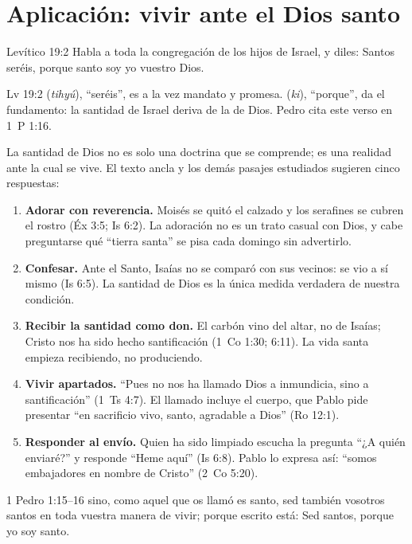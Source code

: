 \section{Aplicación: vivir ante el Dios santo}

\begin{verso}{Levítico 19:2}
Habla a toda la congregación de los hijos de Israel, y diles: Santos seréis, porque santo soy yo \SENOR{} vuestro Dios.
\end{verso}

\begin{filologiatexto}{Lv 19:2}
 (\emph{tihyú}), ``seréis'', es a la vez mandato y promesa.  (\emph{ki}), ``porque'', da el fundamento: la santidad de Israel deriva de la de Dios. Pedro cita este verso en 1~P 1:16.
\end{filologiatexto}

La santidad de Dios no es solo una doctrina que se comprende; es una realidad ante la cual se vive. El texto ancla y los demás pasajes estudiados sugieren cinco respuestas:

\begin{enumerate}
\item \textbf{Adorar con reverencia.} Moisés se quitó el calzado y los serafines se cubren el rostro (Éx 3:5; Is 6:2). La adoración no es un trato casual con Dios, y cabe preguntarse qué ``tierra santa'' se pisa cada domingo sin advertirlo.
\item \textbf{Confesar.} Ante el Santo, Isaías no se comparó con sus vecinos: se vio a sí mismo (Is 6:5). La santidad de Dios es la única medida verdadera de nuestra condición.
\item \textbf{Recibir la santidad como don.} El carbón vino del altar, no de Isaías; Cristo nos ha sido hecho santificación (1~Co 1:30; 6:11). La vida santa empieza recibiendo, no produciendo.
\item \textbf{Vivir apartados.} ``Pues no nos ha llamado Dios a inmundicia, sino a santificación'' (1~Ts 4:7). El llamado incluye el cuerpo, que Pablo pide presentar ``en sacrificio vivo, santo, agradable a Dios'' (Ro 12:1).
\item \textbf{Responder al envío.} Quien ha sido limpiado escucha la pregunta ``¿A quién enviaré?'' y responde ``Heme aquí'' (Is 6:8). Pablo lo expresa así: ``somos embajadores en nombre de Cristo'' (2~Co 5:20).
\end{enumerate}

\begin{verso}{1 Pedro 1:15–16}
sino, como aquel que os llamó es santo, sed también vosotros santos en toda vuestra manera de vivir; porque escrito está: Sed santos, porque yo soy santo.
\end{verso}

